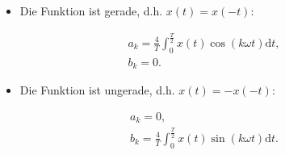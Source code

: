 \documentclass[11pt,a4paper,DIV=12]{scrartcl}
\newcommand{\diff}{\mathrm{d}}
\begin{document}
\begin{itemize}
	\item Die Funktion ist gerade, d.h. $x(t)=x(-t)$:
\end{itemize}
\begin{gather}
	\label{eq:KoeffGerade}
	a_k=\frac{4}{T}\int_0^{\frac{T}{2}}x(t)\cos(k \omega t)\diff t,\\
	b_k=0.
\end{gather}
\begin{itemize}
	\item Die Funktion ist ungerade, d.h. $x(t)=-x(-t)$:
\end{itemize}
\begin{gather}
	\label{eq:KoeffUngerade}
	a_k = 0,\\
	b_k=\frac{4}{T}\int_0^{\frac{T}{2}}x(t)\sin(k \omega t)\diff t.
\end{gather}
\newpage
\end{document}
